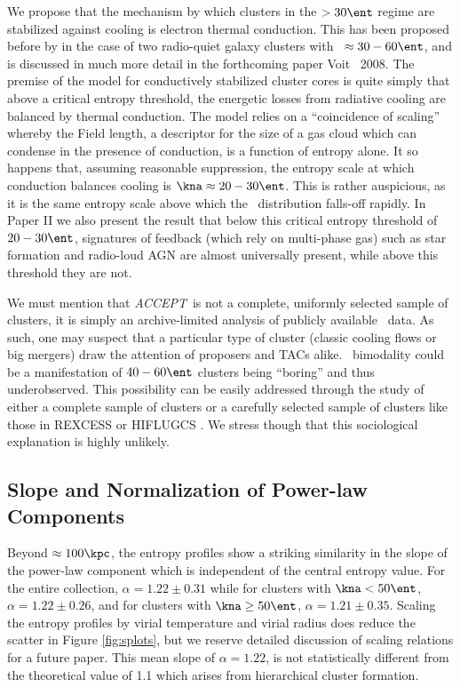 \documentclass[12pt, preprint]{aastex}
\newcommand{\accept}{\textit{ACCEPT}}
\begin{document}
{{We propose that the mechanism by which clusters in the $> 30 \ent$
regime are stabilized against cooling is electron thermal
conduction. This has been proposed before by
\cite{2005ApJ...630L..13D} in the case of two radio-quiet galaxy
clusters with \kna\ $\approx 30-60 \ent$, and is discussed in much
more detail in the forthcoming paper Voit \etal\ 2008. The premise of
the model for conductively stabilized cluster cores is quite simply
that above a critical entropy threshold, the energetic losses from
radiative cooling are balanced by thermal conduction. The model relies
on a ``coincidence of scaling'' whereby the Field length, a descriptor
for the size of a gas cloud which can condense in the presence of
conduction, is a function of entropy alone. It so happens that,
assuming reasonable suppression, the entropy scale at which conduction
balances cooling is $\kna \approx 20-30 \ent$. This is rather
auspicious, as it is the same entropy scale above which the \kna\
distribution falls-off rapidly. In Paper II we also present the result
that below this critical entropy threshold of $20-30 \ent$, signatures
of feedback (which rely on multi-phase gas) such as star formation and
radio-loud AGN are almost universally present, while above this
threshold they are not.

We must mention that \accept\ is not a complete, uniformly selected
sample of clusters, it is simply an archive-limited analysis of 
publicly available \Chandra\ data. As such, one may suspect that a
particular type of cluster (classic cooling flows or big mergers) draw
the attention of proposers and TACs alike. \kna\ bimodality could be a
manifestation of $40-60 \ent$ clusters being ``boring'' and thus
underobserved. This possibility can be easily addressed through the
study of either a complete sample of clusters or a carefully selected
sample of clusters like those in REXCESS \citep{2007A&A...469..363B}
or HIFLUGCS \citep{2002ApJ...567..716R}. We stress though that this
sociological explanation is highly unlikely.

\subsection{Slope and Normalization of Power-law Components}
\label{sec:slopes}

Beyond $\approx 100 \kpc$, the entropy profiles show a striking
similarity in the slope of the power-law component which is
independent of the central entropy value. For the entire collection,
$\alpha = 1.22 \pm 0.31$ while for clusters with $\kna < 50 \ent$,
$\alpha = 1.22 \pm 0.26$, and for clusters with $\kna \geq 50 \ent$,
$\alpha = 1.21 \pm 0.35$. Scaling the entropy profiles by virial
temperature and virial radius does reduce the scatter in Figure
\ref{fig:splots}, but we reserve detailed discussion of scaling
relations for a future paper. This mean slope of $\alpha = 1.22$, is
not statistically different from the theoretical value of 1.1
\citep{2001ApJ...546...63T} which arises from hierarchical cluster
formation.

}}
\end{document}
